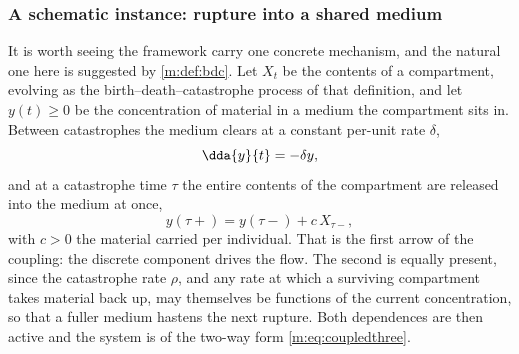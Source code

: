 %

\subsubsection{A schematic instance: rupture into a shared medium}
\label{m:sec:coupledexample}

It is worth seeing the framework carry one concrete mechanism, and the natural
one here is suggested by \cref{m:def:bdc}. Let $X_t$ be the contents of a
compartment, evolving as the birth--death--catastrophe process of that
definition, and let $y(t)\ge0$ be the concentration of material in a medium the
compartment sits in. Between catastrophes the medium clears at a constant
per-unit rate $\delta$,
\begin{equation}
\label{m:eq:mediumdecay}
\dda{y}{t} = -\delta y ,
\end{equation}
and at a catastrophe time $\tau$ the entire contents of the compartment are
released into the medium at once,
\begin{equation}
\label{m:eq:mediumjump}
y(\tau+) = y(\tau-) + c\,X_{\tau-} ,
\end{equation}
with $c>0$ the material carried per individual. That is the first arrow of the
coupling: the discrete component drives the flow. The second is equally present,
since the catastrophe rate $\rho$, and any rate at which a surviving compartment
takes material back up, may themselves be functions of the current concentration,
so that a fuller medium hastens the next rupture. Both dependences are then
active and the system is of the two-way form \cref{m:eq:coupledthree}.

